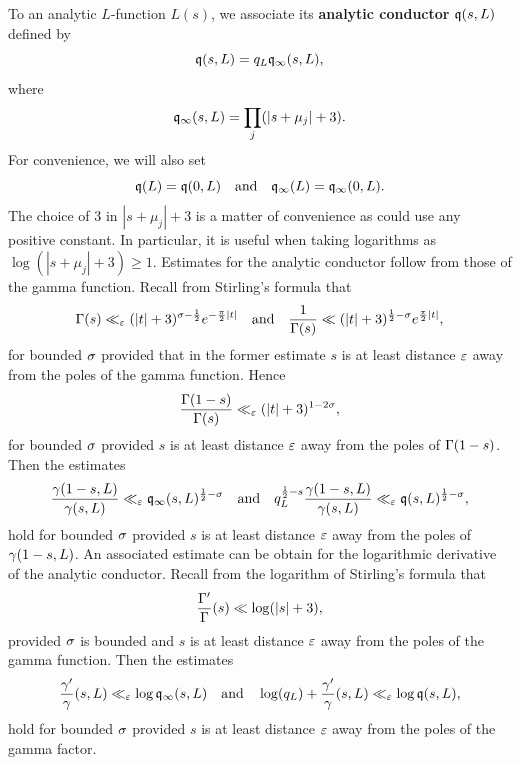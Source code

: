     To an analytic \(L\)-function \(L(s)\), we associate its \textbf{analytic conductor} \(\mathfrak{q}(s,L)\) defined by
    \[
      \mathfrak{q}(s,L) = q_{L}\mathfrak{q}_{\infty}(s,L),
    \]
    where
    \[
      \mathfrak{q}_{\infty}(s,L) = \prod_{j}(|s+\mu_{j}|+3).
    \]
    For convenience, we will also set
    \[
      \mathfrak{q}(L) = \mathfrak{q}(0,L) \quad \text{and} \quad \mathfrak{q}_{\infty}(L) = \mathfrak{q}_{\infty}(0,L).
    \]
    The choice of \(3\) in \(|s+\mu_{j}|+3\) is a matter of convenience as could use any positive constant. In particular, it is useful when taking logarithms as \(\log(|s+\mu_{j}|+3) \ge 1\). Estimates for the analytic conductor follow from those of the gamma function. Recall from Stirling's formula that
    \begin{equation}\label{equ:vertical_strip_gamma_estimates}
      \Gamma(s) \ll_{\varepsilon} (|t|+3)^{\sigma-\frac{1}{2}}e^{-\frac{\pi}{2}|t|} \quad \text{and} \quad \frac{1}{\Gamma(s)} \ll (|t|+3)^{\frac{1}{2}-\sigma}e^{\frac{\pi}{2}|t|},
    \end{equation}
    for bounded \(\sigma\) provided that in the former estimate \(s\) is at least distance \(\varepsilon\) away from the poles of the gamma function. Hence
    \[
      \frac{\Gamma(1-s)}{\Gamma(s)} \ll_{\varepsilon} (|t|+3)^{1-2\sigma},
    \]
    for bounded \(\sigma\) provided \(s\) is at least distance \(\varepsilon\) away from the poles of \(\Gamma(1-s)\). Then the estimates
     \begin{equation}\label{equ:gamma_factor_analytic_conductor_estimate}
      \frac{\gamma(1-s,L)}{\gamma(s,L)} \ll_{\varepsilon} \mathfrak{q}_{\infty}(s,L)^{\frac{1}{2}-\sigma} \quad \text{and} \quad q_{L}^{\frac{1}{2}-s}\frac{\gamma(1-s,L)}{\gamma(s,L)} \ll_{\varepsilon} \mathfrak{q}(s,L)^{\frac{1}{2}-\sigma},
    \end{equation}
    hold for bounded \(\sigma\) provided \(s\) is at least distance \(\varepsilon\) away from the poles of \(\gamma(1-s,L)\). An associated estimate can be obtain for the logarithmic derivative of the analytic conductor. Recall from the logarithm of Stirling's formula that
    \[
      \frac{\Gamma'}{\Gamma}(s) \ll \log(|s|+3),
    \]
    provided \(\sigma\) is bounded and \(s\) is at least distance \(\varepsilon\) away from the poles of the gamma function. Then the estimates
    \begin{equation}\label{equ:digamma_gamma_factor_analytic_conductor_estimate}
      \frac{\gamma'}{\gamma}(s,L) \ll_{\varepsilon} \log\mathfrak{q}_{\infty}(s,L) \quad \text{and} \quad \log(q_{L})+\frac{\gamma'}{\gamma}(s,L) \ll_{\varepsilon} \log\mathfrak{q}(s,L),
    \end{equation}
    hold for bounded \(\sigma\) provided \(s\) is at least distance \(\varepsilon\) away from the poles of the gamma factor.
    
